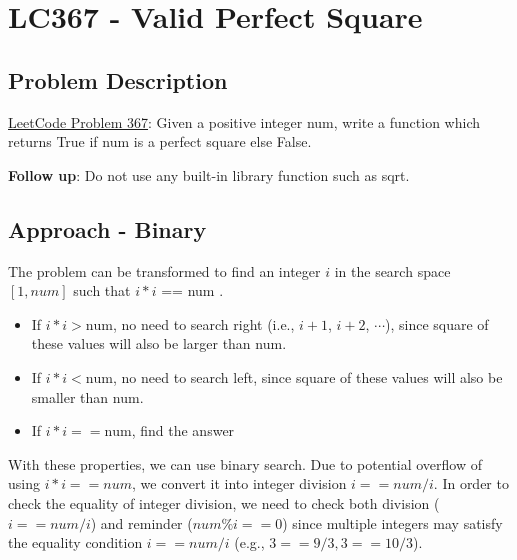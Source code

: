 \documentclass[justified]{tufte-book}
\begin{document}
\section{LC367 - Valid Perfect Square} \label{sec:lc367_valid_perfect_square}
\subsection{Problem Description}
\href{https://leetcode.com/problems/valid-perfect-square/}{LeetCode Problem 367}: Given a positive integer num, write a function which returns True if num is a perfect square else False.

\textbf{Follow up}: Do not use any built-in library function such as sqrt.

\subsection{Approach - Binary}
The problem can be transformed to find an integer $i$ in the search space $[1, num]$ such that $i*i$ == num . 
\begin{itemize}
    \item If $i*i > \text{num}$, no need to search right (i.e., $i+1$, $i+2$, $\cdots$), since square of these values will also be larger than num.
    \item If $i*i < \text{num}$, no need to search left, since square of these values will also be smaller than num.
    \item If $i*i == \text{num}$, find the answer
\end{itemize}
With these properties, we can use binary search. Due to potential overflow of using $i*i == num$, we convert it into integer division $i == num/i$. In order to check the equality of integer division, we need to check both division ($i == num/i$) and reminder ($num\%i == 0$) since multiple integers may satisfy the equality condition $i == num/i$ (e.g., $3 == 9/3, 3 == 10/3$).
\end{document}
